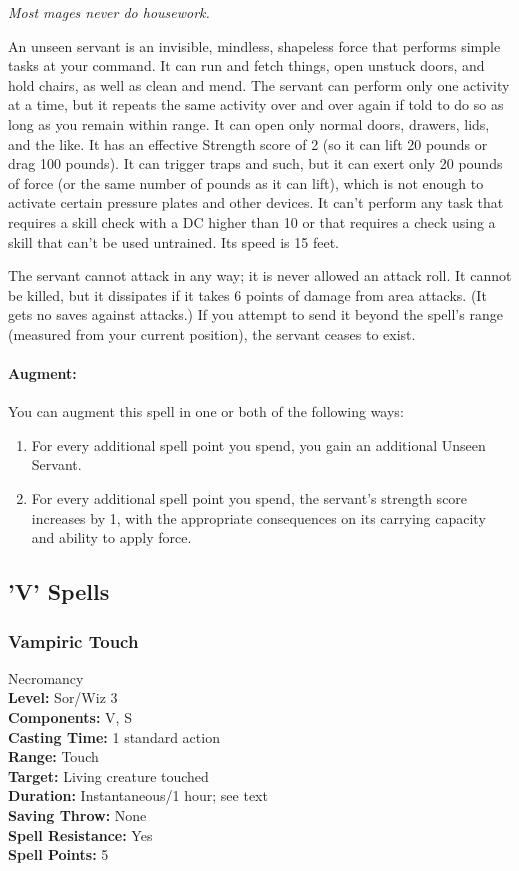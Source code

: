 \emph{Most mages never do housework.}

An unseen servant is an invisible, mindless, shapeless force that performs simple tasks at your command. 
It can run and fetch things, open unstuck doors, and hold chairs, as well as clean and mend. 
The servant can perform only one activity at a time, but it repeats the same activity over and over again if told to do so as long as you remain within range. 
It can open only normal doors, drawers, lids, and the like. 
It has an effective Strength score of 2 (so it can lift 20 pounds or drag 100 pounds). 
It can trigger traps and such, but it can exert only 20 pounds of force (or the same number of pounds as it can lift), 
which is not enough to activate certain pressure plates and other devices. 
It can't perform any task that requires a skill check with a DC higher than 10 or that requires a check using a skill that can't be used untrained. 
Its speed is 15 feet.

The servant cannot attack in any way; it is never allowed an attack roll. 
It cannot be killed, but it dissipates if it takes 6 points of damage from area attacks. (It gets no saves against attacks.) 
If you attempt to send it beyond the spell's range (measured from your current position), the servant ceases to exist.

\paragraph{Augment:} You can augment this spell in one or both of the following ways:
\begin{enumerate}
 \item For every additional spell point you spend, you gain an additional Unseen Servant.
 \item For every additional spell point you spend, the servant's strength score increases by 1, with the appropriate consequences on its carrying capacity and
 ability to apply force.
\end{enumerate}
\subsection{'V' Spells}
\subsubsection{Vampiric Touch}
\label{Spell:VampiricTouch}
Necromancy
\\ \textbf{Level:} Sor/Wiz 3
\\ \textbf{Components:} V, S
\\ \textbf{Casting Time:} 1 standard action
\\ \textbf{Range:} Touch
\\ \textbf{Target:} Living creature touched
\\ \textbf{Duration:} Instantaneous/1 hour; see text
\\ \textbf{Saving Throw:} None
\\ \textbf{Spell Resistance:} Yes
\\ \textbf{Spell Points:} 5

